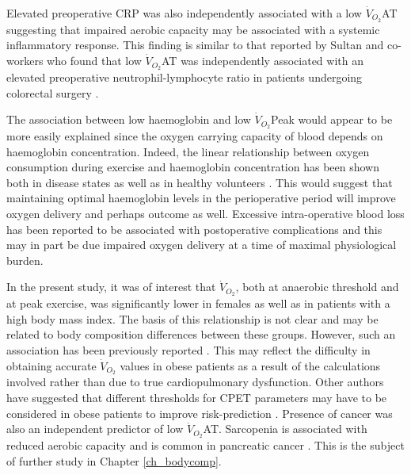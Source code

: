 Elevated preoperative CRP was also independently associated with a low $\dot{V}_{O_2}$AT suggesting that impaired aerobic capacity may be associated with a systemic inflammatory response.
This finding is similar to that reported by Sultan and co-workers who found that low $\dot{V}_{O_2}$AT was independently associated with an elevated preoperative neutrophil-lymphocyte ratio in patients undergoing colorectal surgery \parencite{sultan_cardiopulmonary_2014}.

The association between low haemoglobin and low $\dot{V}_{O_2}$Peak would appear to be more easily explained since the oxygen carrying capacity of blood depends on haemoglobin concentration.  
Indeed, the linear relationship between oxygen consumption during exercise and haemoglobin concentration has been shown both in disease states \parencite{agostoni_relationship_2010} as well as in healthy volunteers \parencite{dellweg_cardiopulmonary_2008}.
This would suggest that maintaining optimal haemoglobin levels in the perioperative period will improve oxygen delivery and perhaps outcome as well. 
Excessive intra-operative blood loss has been reported to be associated with postoperative complications \parencite{pratt_risk_2008} and this may in part be due impaired oxygen delivery at a time of maximal physiological burden.

In the present study, it was of interest that $\dot{V}_{O_2}$, both at anaerobic threshold and at peak exercise, was significantly lower in females as well as in patients with  a high body mass index.
The basis of this relationship is not clear and may be related to body composition differences between these groups.
However, such an association has been previously reported \parencite{horwich_relationship_2009}.
This may reflect the difficulty in obtaining accurate $\dot{V}_{O_2}$ values in obese patients as a result of the calculations involved rather than due to true cardiopulmonary dysfunction. 
Other authors have suggested that different thresholds for CPET parameters may have to be considered in obese patients to improve risk-prediction \parencite{donnelly_criteria_1990,hulens_exercise_2001}.
Presence of cancer was also an independent predictor of low $\dot{V}_{O_2}$AT.
Sarcopenia is associated with reduced aerobic capacity \parencite{evans_sarcopenia_1993} and is common in pancreatic cancer \parencite{joglekar_sarcopenia_2015}.
This is the subject of further study in Chapter \ref{ch_bodycomp}.

